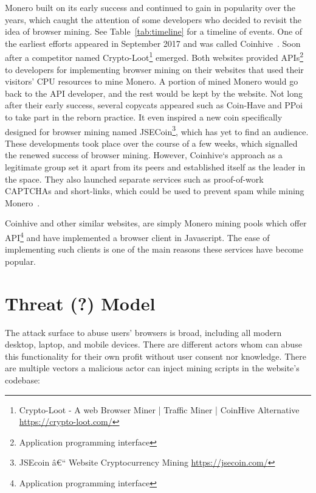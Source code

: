 Monero built on its early success and continued to gain in popularity over the years, which caught the attention of some developers who decided to revisit the idea of browser mining. See Table~\ref{tab:timeline} for a timeline of events.  One of the earliest efforts appeared in September 2017 and was called Coinhive~\cite{coinhive}. Soon after a competitor named Crypto-Loot\footnote{Crypto-Loot - A web Browser Miner | Traffic Miner | CoinHive Alternative \url{https://crypto-loot.com/}} emerged. Both websites provided APIs\footnote{Application programming interface} to developers for implementing browser mining on their websites that used their visitors' CPU resources to mine Monero. A portion of mined Monero would go back to the API developer, and the rest would be kept by the website. Not long after their early success, several copycats appeared such as Coin-Have and PPoi~\cite{coinhivecopycats} to take part in the reborn practice. It even inspired a new coin specifically designed for browser mining named JSECoin\footnote{JSEcoin â€“ Website Cryptocurrency Mining \url{https://jsecoin.com/}}, which has yet to find an audience. These developments took place over the course of a few weeks, which signalled the renewed success of browser mining. However, Coinhive`s approach as a legitimate group set it apart from its peers and established itself as the leader in the space. They also launched separate services such as proof-of-work CAPTCHAs and short-links, which could be used to prevent spam while mining Monero~\cite{coinhive}.


Coinhive and other similar websites, are simply Monero mining pools which offer API\footnote{Application programming interface} and have implemented a browser client in Javascript. The ease of implementing such clients is one of the main reasons these services have become popular. 




\section{Threat (?) Model}
The attack surface to abuse users' browsers is broad, including all modern desktop, laptop, and mobile devices. There are different actors whom can abuse this functionality for their own profit without user consent nor knowledge. There are multiple vectors a malicious actor can inject mining scripts in the website's codebase:

